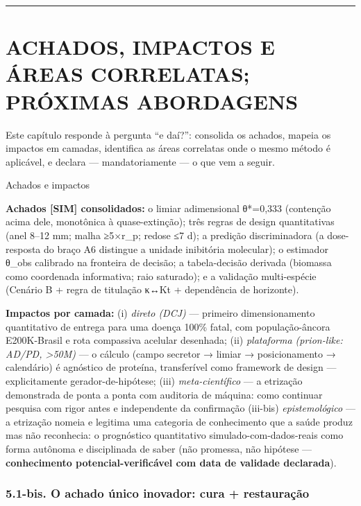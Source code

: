 \documentclass[12pt,a4paper,oneside]{report}
\begin{document}
\begin{center}\rule{0.5\linewidth}{0.5pt}\end{center}

\hypertarget{achados-impactos-e-uxe1reas-correlatas-pruxf3ximas-abordagens}{%
\chapter{ACHADOS, IMPACTOS E ÁREAS CORRELATAS; PRÓXIMAS
ABORDAGENS}\label{achados-impactos-e-uxe1reas-correlatas-pruxf3ximas-abordagens}}

Este capítulo responde à pergunta ``e daí?'': consolida os achados,
mapeia os impactos em camadas, identifica as áreas correlatas onde o
mesmo método é aplicável, e declara --- mandatoriamente --- o que vem a
seguir.

Achados e impactos

\textbf{Achados {[}SIM{]} consolidados:} o limiar adimensional θ*=0,333
(contenção acima dele, monotônica à quase-extinção); três regras de
design quantitativas (anel 8--12 mm; malha ≥5×r\_p; redose ≤7 d); a
predição discriminadora (a dose-resposta do braço A6 distingue a unidade
inibitória molecular); o estimador θ\_obs calibrado na fronteira de
decisão; a tabela-decisão derivada (biomassa como coordenada
informativa; raio saturado); e a validação multi-espécie (Cenário B +
regra de titulação κ↔Kt + dependência de horizonte).

\textbf{Impactos por camada:} (i) \emph{direto (DCJ)} --- primeiro
dimensionamento quantitativo de entrega para uma doença 100\% fatal, com
população-âncora E200K-Brasil e rota compassiva acelular desenhada; (ii)
\emph{plataforma (prion-like: AD/PD, \textgreater50M)} --- o cálculo
(campo secretor → limiar → posicionamento → calendário) é agnóstico de
proteína, transferível como framework de design --- explicitamente
gerador-de-hipótese; (iii) \emph{meta-científico} --- a etrização
demonstrada de ponta a ponta com auditoria de máquina: como continuar
pesquisa com rigor antes e independente da confirmação (iii-bis)
\emph{epistemológico} --- a etrização nomeia e legitima uma categoria de
conhecimento que a saúde produz mas não reconhecia: o prognóstico
quantitativo simulado-com-dados-reais como forma autônoma e disciplinada
de saber (não promessa, não hipótese --- \textbf{conhecimento
potencial-verificável com data de validade declarada}).

\hypertarget{bis.-o-achado-uxfanico-inovador-cura-restaurauxe7uxe3o}{%
\subsection{5.1-bis. O achado único inovador: cura +
restauração}\label{bis.-o-achado-uxfanico-inovador-cura-restaurauxe7uxe3o}}
\end{document}
